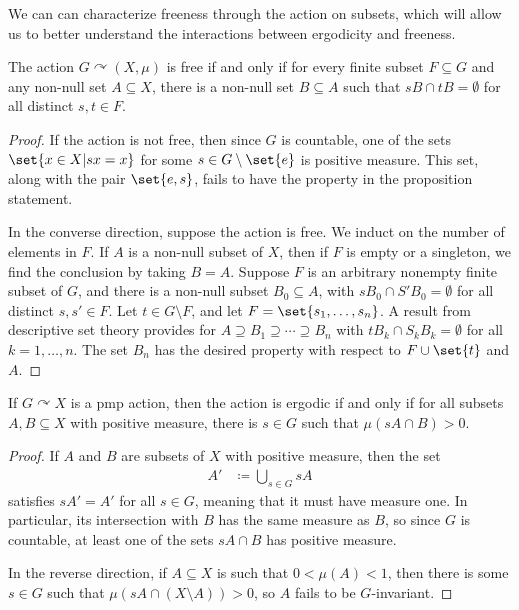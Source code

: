\documentclass[10pt]{mypackage}
\renewcommand{\coloneq}{\coloneqq}
\begin{document}
We can can characterize freeness through the action on subsets, which will allow us to better understand the interactions between ergodicity and freeness.
\begin{proposition}
  The action $G\curvearrowright \left( X,\mu \right)$ is free if and only if for every finite subset $F\subseteq G$ and any non-null set $A\subseteq X$, there is a non-null set $B\subseteq A$ such that $sB\cap tB = \emptyset$ for all distinct $s,t\in F$.
\end{proposition}
\begin{proof}
  If the action is not free, then since $G$ is countable, one of the sets $\set{x\in X | sx = x}$ for some $s\in G\setminus \set{e}$ is positive measure. This set, along with the pair $\set{e,s}$, fails to have the property in the proposition statement.

  In the converse direction, suppose the action is free. We induct on the number of elements in $F$. If $A$ is a non-null subset of $X$, then if $F$ is empty or a singleton, we find the conclusion by taking $B = A$. Suppose $F$ is an arbitrary nonempty finite subset of $G$, and there is a non-null subset $B_0\subseteq A$, with $sB_0\cap S'B_0 = \emptyset$ for all distinct $s,s'\in F$. Let $t\in G\setminus F$, and let $F = \set{s_1,\dots,s_n}$. A result from descriptive set theory provides for $A\supseteq B_1\supseteq\cdots\supseteq B_n$ with $tB_k\cap S_kB_k = \emptyset$ for all $k=1,\dots,n$. The set $B_n$ has the desired property with respect to $F\cup \set{t}$ and $A$.
\end{proof}
\begin{proposition}
  If $G\curvearrowright X$ is a pmp action, then the action is ergodic if and only if for all subsets $A,B\subseteq X$ with positive measure, there is $s\in G$ such that $\mu\left( sA\cap B \right) > 0$.
\end{proposition}
\begin{proof}
  If $A$ and $B$ are subsets of $X$ with positive measure, then the set
  \begin{align*}
    A' &\coloneq \bigcup_{s\in G}sA
  \end{align*}
  satisfies $sA'=A'$ for all $s\in G$, meaning that it must have measure one. In particular, its intersection with $B$ has the same measure as $B$, so since $G$ is countable, at least one of the sets $sA\cap B$ has positive measure.

  In the reverse direction, if $A\subseteq X$ is such that $0 < \mu(A) < 1$, then there is some $s\in G$ such that $\mu\left( sA\cap \left( X\setminus A \right) \right) > 0$, so $A$ fails to be $G$-invariant.
\end{proof}
\end{document}
